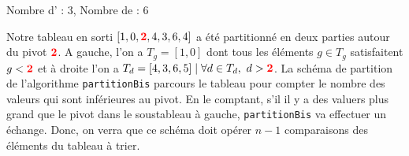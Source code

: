 \documentclass[10pt]{article} %
\begin{document}
\vspace{-0.4cm}
\noindent Nombre d' : 3, Nombre de  : 6

\vspace{0.2cm}
Notre tableau en sorti $[1, 0, \textcolor{red}{{\bf2}}, 4, 3, 6, 4]$ a été partitionné en deux parties autour du pivot $\textcolor{red}{{\bf2}}$. A gauche, l'on a $T_g = [1, 0]$ dont tous
les éléments $g \in T_g$ satisfaitent $g < \textcolor{red}{{\bf2}}$ et à droite l'on a $T_d = [4, 3, 6, 5] \mid \forall d \in T_d,\ d > \textcolor{red}{{\bf2}}$. La schéma de partition de
l'algorithme \texttt{partitionBis} parcours le tableau pour compter le nombre des valeurs qui sont inférieures au pivot. En le comptant, s'il il y a des
valuers plus grand que le pivot dans le soustableau à gauche, \texttt{partitionBis} va effectuer un échange. Donc, on verra que ce schéma doit opérer $n - 1$ comparaisons
des éléments du tableau à trier.

\newpage

\pagestyle{fancy}
\end{document}
